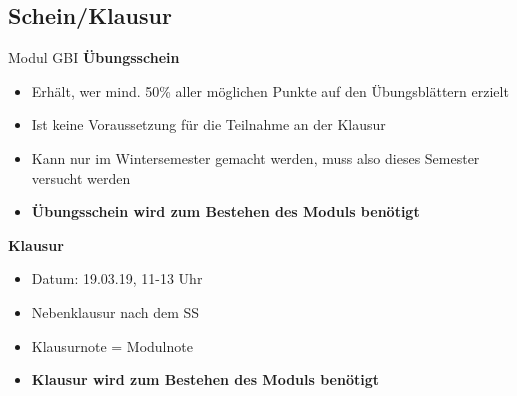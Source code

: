 \subsection{Schein/Klausur}
 \begin{frame}{Modul GBI}
		\textbf{Übungsschein}
			\begin{itemize}
				\item Erhält, wer mind. 50\% aller möglichen Punkte auf den Übungsblättern erzielt
				\item Ist keine Voraussetzung für die Teilnahme an der Klausur
				\item Kann nur im Wintersemester gemacht werden, muss also dieses Semester versucht werden
				\item \textbf{Übungsschein wird zum Bestehen des Moduls benötigt} 
			\end{itemize}
		\pause	
		\textbf{Klausur}
		\begin{itemize}
				\item Datum: 19.03.19, 11-13 Uhr
				\item Nebenklausur nach dem SS
				\item Klausurnote = Modulnote
				\item \textbf{Klausur wird zum Bestehen des Moduls benötigt} 
			\end{itemize}
	\end{frame}
	
